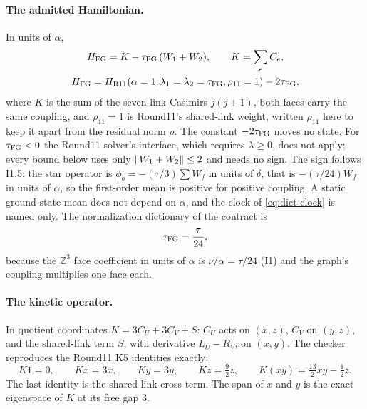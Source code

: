 \paragraph{The admitted Hamiltonian.}
In units of $\alpha$,
\begin{equation}
 \begin{gathered}
 H_{\rm FG}=K-\tau_{\mathrm{FG}}\,(W_1+W_2),\qquad K=\sum_{e}C_e,\\
 H_{\rm FG}=H_{\rm R11}(\alpha=1,\lambda_1=\lambda_2=\tau_{\mathrm{FG}},\rho_{11}=1)-2\tau_{\mathrm{FG}} ,
 \end{gathered}
 \label{eq:az2-hamiltonian}
\end{equation}
where $K$ is the sum of the seven link Casimirs $j(j+1)$, both faces carry the
same coupling, and $\rho_{11}=1$ is Round11's shared-link weight, written
$\rho_{11}$ here to keep it apart from the residual norm $\rho$. The constant
$-2\tau_{\mathrm{FG}}$ moves no state. For $\tau_{\mathrm{FG}}<0$ the Round11 solver's interface, which
requires $\lambda\ge0$, does not apply; every bound below uses only
$\left\lVert W_1+W_2\right\rVert\le2$ and needs no sign. The sign follows I1.5: the star
operator is $\phi_b=-(\tau/3)\sum W_f$ in units of $\delta$, that is
$-(\tau/24)W_f$ in units of $\alpha$, so the first-order mean is positive for
positive coupling. A static ground-state mean does not depend on $\alpha$,
and the clock of \eqref{eq:dict-clock} is named only. The normalization
dictionary of the contract is
\begin{equation}
 \tau_{\mathrm{FG}}=\frac\tau{24},
 \label{eq:az2-dictionary}
\end{equation}
because the $\mathbb Z^3$ face coefficient in units of $\alpha$ is
$\nu/\alpha=\tau/24$ (I1) and the graph's coupling multiplies one face each.

\paragraph{The kinetic operator.}
In quotient coordinates $K=3C_U+3C_V+S$: $C_U$ acts on $(x,z)$, $C_V$ on
$(y,z)$, and the shared-link term $S$, with derivative $L_U-R_V$, on $(x,y)$.
The checker reproduces the Round11 K5 identities exactly:
\begin{equation}
 K1=0,\qquad Kx=3x,\qquad Ky=3y,\qquad Kz=\tfrac92z,\qquad
 K(xy)=\tfrac{13}2xy-\tfrac12z .
 \label{eq:az2-k5}
\end{equation}
The last identity is the shared-link cross term. The span of $x$ and $y$ is
the exact eigenspace of $K$ at its free gap $3$.


